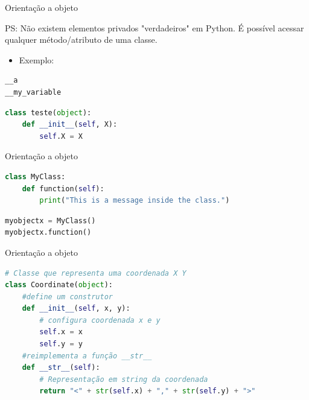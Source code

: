 \documentclass[aspectratio=169]{beamer} %
\begin{document}
\begin{SliTC}{Orientação a objeto}


PS: Não existem elementos privados "verdadeiros" em Python. É possível acessar qualquer método/atributo de uma classe.

\begin{itemize}
    \item Exemplo:
\end{itemize}
\begin{lstlisting}[language=python]
__a 
__my_variable
\end{lstlisting}


\begin{lstlisting}[language=python]
class teste(object):
    def __init__(self, X):
        self.X = X
\end{lstlisting}
\end{SliTC}

\begin{SliTC}{Orientação a objeto}

\begin{lstlisting}[language=python]
class MyClass:
    def function(self):
        print("This is a message inside the class.")
\end{lstlisting}
\begin{lstlisting}[language=python]
myobjectx = MyClass()
myobjectx.function()
\end{lstlisting}

\end{SliTC}


\begin{SliTC}{Orientação a objeto}

\begin{lstlisting}[language=python]
# Classe que representa uma coordenada X Y
class Coordinate(object):
    #define um construtor
    def __init__(self, x, y):
        # configura coordenada x e y
        self.x = x
        self.y = y
    #reimplementa a função __str__    
    def __str__(self):
        # Representação em string da coordenada
        return "<" + str(self.x) + "," + str(self.y) + ">"
\end{lstlisting}
\end{SliTC}
\end{document}
